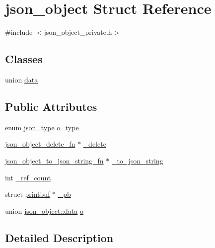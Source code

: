 \hypertarget{structjson__object}{}\section{json\+\_\+object Struct Reference}
\label{structjson__object}


{\ttfamily \#include $<$json\+\_\+object\+\_\+private.\+h$>$}

\subsection*{Classes}
\begin{DoxyCompactItemize}
\item 
union \hyperlink{unionjson__object_1_1data}{data}
\end{DoxyCompactItemize}
\subsection*{Public Attributes}
\begin{DoxyCompactItemize}
\item 
enum \hyperlink{json__object_8h_ac75c61993722a9b8aaa44704072ec06c}{json\+\_\+type} \hyperlink{structjson__object_a28307a4a3fe6cefe27e28fec56b76b3e}{o\+\_\+type}
\item 
\hyperlink{json__object__private_8h_a38067e570c75b31878ded6d8e554d560}{json\+\_\+object\+\_\+delete\+\_\+fn} $\ast$ \hyperlink{structjson__object_aa3a238f4b671c21fa0578fc37a126c2e}{\+\_\+delete}
\item 
\hyperlink{json__object__private_8h_acb59d23dfb70e7662e3cde965ee2b29b}{json\+\_\+object\+\_\+to\+\_\+json\+\_\+string\+\_\+fn} $\ast$ \hyperlink{structjson__object_a077a02daac4653f91584dd7f47c3d632}{\+\_\+to\+\_\+json\+\_\+string}
\item 
int \hyperlink{structjson__object_aca9b93573ba6bb8cf66d87c170a575b2}{\+\_\+ref\+\_\+count}
\item 
struct \hyperlink{structprintbuf}{printbuf} $\ast$ \hyperlink{structjson__object_afdcaa9e24bce7c86c33cb6f6ae65cb56}{\+\_\+pb}
\item 
union \hyperlink{unionjson__object_1_1data}{json\+\_\+object\+::data} \hyperlink{structjson__object_a33aff83ffea02b934235c4821cca8cf0}{o}
\end{DoxyCompactItemize}


\subsection{Detailed Description}


